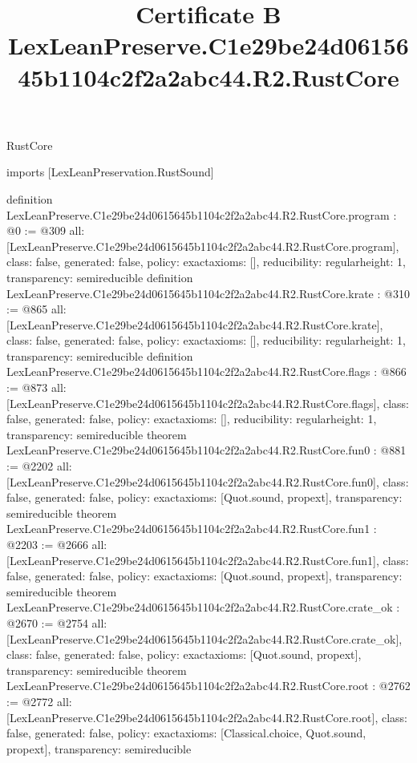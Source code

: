 \begin{lexlean}{RustCore}
\title{Certificate B LexLeanPreserve.C1e29be24d0615645b1104c2f2a2abc44.R2.RustCore}
\begin{coremodule}
imports [LexLeanPreservation.RustSound]

definition LexLeanPreserve.C1e29be24d0615645b1104c2f2a2abc44.R2.RustCore.program : @0 := @309 {
  all: [LexLeanPreserve.C1e29be24d0615645b1104c2f2a2abc44.R2.RustCore.program],
  class: false,
  generated: false,
  policy: exact{axioms: []},
  reducibility: regular{height: 1},
  transparency: semireducible
}
definition LexLeanPreserve.C1e29be24d0615645b1104c2f2a2abc44.R2.RustCore.krate : @310 := @865 {
  all: [LexLeanPreserve.C1e29be24d0615645b1104c2f2a2abc44.R2.RustCore.krate],
  class: false,
  generated: false,
  policy: exact{axioms: []},
  reducibility: regular{height: 1},
  transparency: semireducible
}
definition LexLeanPreserve.C1e29be24d0615645b1104c2f2a2abc44.R2.RustCore.flags : @866 := @873 {
  all: [LexLeanPreserve.C1e29be24d0615645b1104c2f2a2abc44.R2.RustCore.flags],
  class: false,
  generated: false,
  policy: exact{axioms: []},
  reducibility: regular{height: 1},
  transparency: semireducible
}
theorem LexLeanPreserve.C1e29be24d0615645b1104c2f2a2abc44.R2.RustCore.fun0 : @881 := @2202 {
  all: [LexLeanPreserve.C1e29be24d0615645b1104c2f2a2abc44.R2.RustCore.fun0],
  class: false,
  generated: false,
  policy: exact{axioms: [Quot.sound, propext]},
  transparency: semireducible
}
theorem LexLeanPreserve.C1e29be24d0615645b1104c2f2a2abc44.R2.RustCore.fun1 : @2203 := @2666 {
  all: [LexLeanPreserve.C1e29be24d0615645b1104c2f2a2abc44.R2.RustCore.fun1],
  class: false,
  generated: false,
  policy: exact{axioms: [Quot.sound, propext]},
  transparency: semireducible
}
theorem LexLeanPreserve.C1e29be24d0615645b1104c2f2a2abc44.R2.RustCore.crate_ok : @2670 := @2754 {
  all: [LexLeanPreserve.C1e29be24d0615645b1104c2f2a2abc44.R2.RustCore.crate_ok],
  class: false,
  generated: false,
  policy: exact{axioms: [Quot.sound, propext]},
  transparency: semireducible
}
theorem LexLeanPreserve.C1e29be24d0615645b1104c2f2a2abc44.R2.RustCore.root : @2762 := @2772 {
  all: [LexLeanPreserve.C1e29be24d0615645b1104c2f2a2abc44.R2.RustCore.root],
  class: false,
  generated: false,
  policy: exact{axioms: [Classical.choice, Quot.sound, propext]},
  transparency: semireducible
}


\end{coremodule}
\end{lexlean}
